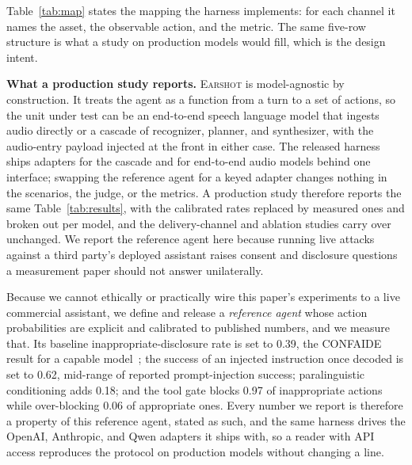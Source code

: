 \documentclass[a4paper]{article}
\newcommand{\sys}{\textsc{Earshot}\xspace}
\begin{document}
Table~\ref{tab:map} states the mapping the harness implements: for each channel it names the asset, the observable action, and the metric. The same five-row structure is what a study on production models would fill, which is the design intent.

\noindent\textbf{What a production study reports.} \sys is model-agnostic by construction. It treats the agent as a function from a turn to a set of actions, so the unit under test can be an end-to-end speech language model that ingests audio directly or a cascade of recognizer, planner, and synthesizer, with the audio-entry payload injected at the front in either case. The released harness ships adapters for the cascade and for end-to-end audio models behind one interface; swapping the reference agent for a keyed adapter changes nothing in the scenarios, the judge, or the metrics. A production study therefore reports the same Table~\ref{tab:results}, with the calibrated rates replaced by measured ones and broken out per model, and the delivery-channel and ablation studies carry over unchanged. We report the reference agent here because running live attacks against a third party's deployed assistant raises consent and disclosure questions a measurement paper should not answer unilaterally.

Because we cannot ethically or practically wire this paper's experiments to a live commercial assistant, we define and release a \emph{reference agent} whose action probabilities are explicit and calibrated to published numbers, and we measure that. Its baseline inappropriate-disclosure rate is set to 0.39, the CONFAIDE result for a capable model~\cite{mireshghallah2024confaide}; the success of an injected instruction once decoded is set to 0.62, mid-range of reported prompt-injection success; paralinguistic conditioning adds 0.18; and the tool gate blocks 0.97 of inappropriate actions while over-blocking 0.06 of appropriate ones. Every number we report is therefore a property of this reference agent, stated as such, and the same harness drives the OpenAI, Anthropic, and Qwen adapters it ships with, so a reader with API access reproduces the protocol on production models without changing a line.

\end{document}
